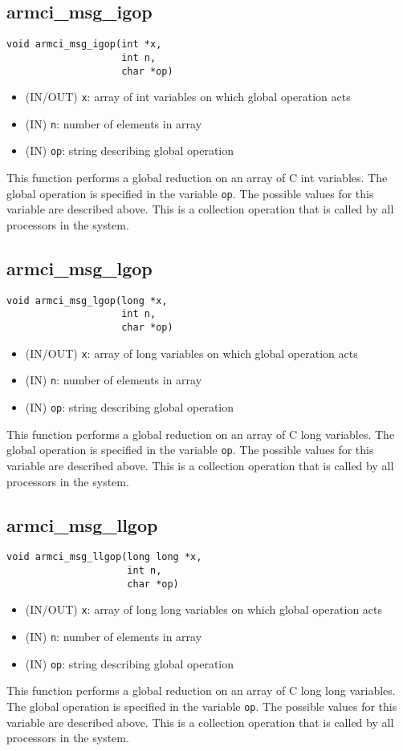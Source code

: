 \documentclass[12pt]{article}
\begin{document}
\subsection{armci\_msg\_igop}
\begin{verbatim}
void armci_msg_igop(int *x,
                    int n,
                    char *op)
\end{verbatim}
\begin{itemize}
\item (IN/OUT) \texttt{x}: array of int variables on which global operation acts
\item (IN) \texttt{n}: number of elements in array
\item (IN) \texttt{op}: string describing global operation
\end{itemize}
This function performs a global reduction on an array of C int variables. The global
operation is specified in the variable \texttt{op}. The possible values for this
variable are described above. This is a collection operation that is called by
all processors in the system.

\subsection{armci\_msg\_lgop}
\begin{verbatim}
void armci_msg_lgop(long *x,
                    int n,
                    char *op)
\end{verbatim}
\begin{itemize}
\item (IN/OUT) \texttt{x}: array of long variables on which global operation acts
\item (IN) \texttt{n}: number of elements in array
\item (IN) \texttt{op}: string describing global operation
\end{itemize}
This function performs a global reduction on an array of C long variables. The global
operation is specified in the variable \texttt{op}. The possible values for this
variable are described above. This is a collection operation that is called by
all processors in the system.

\subsection{armci\_msg\_llgop}
\begin{verbatim}
void armci_msg_llgop(long long *x,
                     int n,
                     char *op)
\end{verbatim}
\begin{itemize}
\item (IN/OUT) \texttt{x}: array of long long variables on which global operation acts
\item (IN) \texttt{n}: number of elements in array
\item (IN) \texttt{op}: string describing global operation
\end{itemize}
This function performs a global reduction on an array of C long long variables. The global
operation is specified in the variable \texttt{op}. The possible values for this
variable are described above. This is a collection operation that is called by
all processors in the system.
\end{document}
